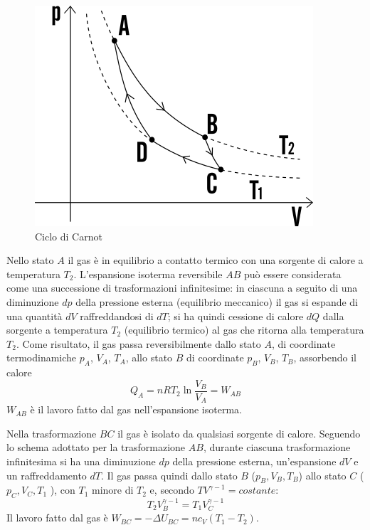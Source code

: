 \documentclass[class=book, crop=false, oneside, 12pt]{standalone}
\begin{document}
\begin{figure}[h]
    \includegraphics[scale=0.4]{ciclo-di-carnot}
    \centering
    \caption{Ciclo di Carnot}
\end{figure}

Nello stato \(A\) il gas è in equilibrio a contatto termico con una sorgente di calore a temperatura \(T_2\).
L'espansione isoterma reversibile \(AB\) può essere considerata come una successione di trasformazioni infinitesime: in ciascuna a seguito di una diminuzione \(dp\) della pressione esterna (equilibrio meccanico) il gas si espande di una quantità \(d V\) raffreddandosi di \(d T\); si ha quindi cessione di calore \(d Q\) dalla sorgente a temperatura \(T_2\) (equilibrio termico) al gas che ritorna alla temperatura \(T_2\). 
Come risultato, il gas passa reversibilmente dallo stato \(A\), di coordinate termodinamiche \(p_A\), \(V_A\), \(T_A\), allo stato \(B\) di coordinate \(p_B\), \(V_B\), \(T_B\), assorbendo il calore
\begin{equation*}
    Q_A = n R T_2 \ln \frac{V_B}{V_A} = W_{AB}
\end{equation*}
\(W_{AB}\) è il lavoro fatto dal gas nell'espansione isoterma. 

Nella trasformazione \(B C\) il gas è isolato da qualsiasi sorgente di calore. 
Seguendo lo schema adottato per la trasformazione \(AB\), durante ciascuna trasformazione infinitesima si ha una diminuzione \(d p\) della pressione esterna, un'espansione \(d V\) e un raffreddamento \(d T\). 
Il gas passa quindi dallo stato \(B\) (\(p_B, V_B, T_B\)) allo stato \(C\) ( \(p_C, V_C, T_1\) ), con \(T_1\) minore di \(T_2\) e, secondo \(TV^{\gamma-1} = costante\):
\begin{equation*}
    T_2 V_B^{\gamma - 1} = T_1 V_C^{\gamma-1}
\end{equation*}
Il lavoro fatto dal gas è \(W_{BC} = -\Delta U_{BC} = n c_V \left(T_1 - T_2\right)\).
\end{document}
